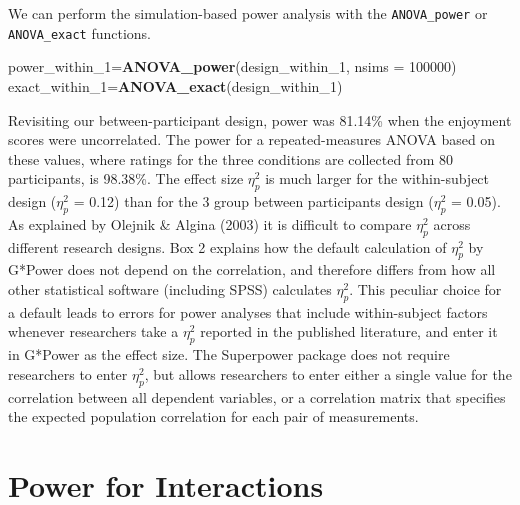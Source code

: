 \documentclass[
  ,jou,floatsintext]{apa6}
\newenvironment{Shaded}{\begin{snugshade}}{\end{snugshade}}
\newcommand{\DataTypeTok}[1]{\textcolor[rgb]{0.13,0.29,0.53}{#1}}
\newcommand{\DecValTok}[1]{\textcolor[rgb]{0.00,0.00,0.81}{#1}}
\newcommand{\KeywordTok}[1]{\textcolor[rgb]{0.13,0.29,0.53}{\textbf{#1}}}
\newcommand{\NormalTok}[1]{#1}
\begin{document}
We can perform the simulation-based power analysis with the \texttt{ANOVA\_power} or \texttt{ANOVA\_exact} functions.

\begin{Shaded}
\begin{Highlighting}[]
\NormalTok{power_within_}\DecValTok{1}\NormalTok{=}\KeywordTok{ANOVA_power}\NormalTok{(design_within_}\DecValTok{1}\NormalTok{,}
                           \DataTypeTok{nsims =} \DecValTok{100000}\NormalTok{)}
\NormalTok{exact_within_}\DecValTok{1}\NormalTok{=}\KeywordTok{ANOVA_exact}\NormalTok{(design_within_}\DecValTok{1}\NormalTok{)}
\end{Highlighting}
\end{Shaded}

Revisiting our between-participant design, power was 81.14\% when the enjoyment scores were uncorrelated.
The power for a repeated-measures ANOVA based on these values, where ratings for the three conditions are collected from 80 participants, is 98.38\%.
The effect size \(\eta_p^2\) is much larger for the within-subject design (\(\eta_p^2\) = 0.12) than for the 3 group between participants design (\(\eta_p^2\) = 0.05).
As explained by Olejnik \& Algina (2003) it is difficult to compare \(\eta_p^2\) across different research designs.
Box 2 explains how the default calculation of \(\eta_p^2\) by G*Power does not depend on the correlation, and therefore differs from how all other statistical software (including SPSS) calculates \(\eta_p^2\).
This peculiar choice for a default leads to errors for power analyses that include within-subject factors whenever researchers take a \(\eta_p^2\) reported in the published literature, and enter it in G*Power as the effect size.
The Superpower package does not require researchers to enter \(\eta_p^2\), but allows researchers to enter either a single value for the correlation between all dependent variables, or a correlation matrix that specifies the expected population correlation for each pair of measurements.

\hypertarget{power-for-interactions}{%
\section{Power for Interactions}\label{power-for-interactions}}
\end{document}

